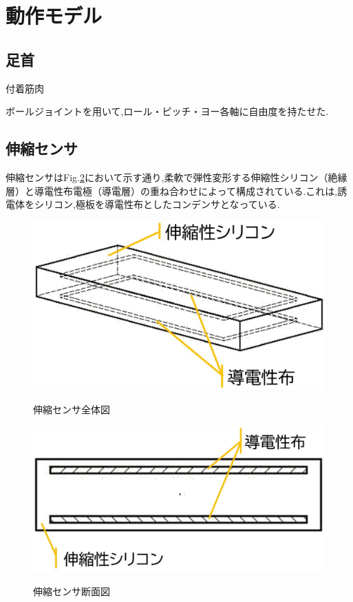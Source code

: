 \section{動作モデル}
\subsection{足首}
付着筋肉 %

ボールジョイントを用いて,ロール・ピッチ・ヨー各軸に自由度を持たせた.

\subsection{伸縮センサ}
伸縮センサはFig.\ref{伸縮センサ断面図}において示す通り,柔軟で弾性変形する伸縮性シリコン（絶縁層）と導電性布電極（導電層）の重ね合わせによって構成されている.これは,誘電体をシリコン,極板を導電性布としたコンデンサとなっている.

\begin{figure}[h]
    \begin{center}
        \label{伸縮センサ全体図}
        \includegraphics[width=0.85\columnwidth,clip]{Photo/BackGround/画像_説明付き/スライド1.eps}
        \caption{伸縮センサ全体図}
    \end{center}
\end{figure}
\begin{figure}[h]
    \begin{center}       
        \label{伸縮センサ断面図}
        \includegraphics[width=0.85\columnwidth,clip]{Photo/BackGround/画像_説明付き/スライド2.eps}
        \caption{伸縮センサ断面図}
    \end{center}
\end{figure}

